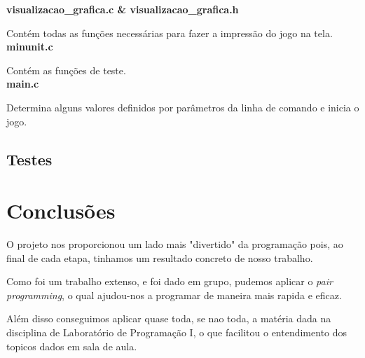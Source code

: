 \documentclass[12pt,a4paper]{article}
\begin{document}
\textbf{visualizacao\_grafica.c \& visualizacao\_grafica.h}

Contém todas as funções necessárias para fazer a impressão do jogo na tela.\\

\textbf{minunit.c}

Contém as funções de teste.\\

\textbf{main.c}

Determina alguns valores definidos por parâmetros da linha de comando e inicia o jogo.\\


\subsection{Testes}

\section{Conclusões}

O projeto nos proporcionou um lado mais "divertido"  da programação pois, ao final de cada etapa, tinhamos um resultado
concreto de nosso trabalho.

Como foi um trabalho extenso, e foi dado em grupo, pudemos aplicar o \emph{pair programming}, o qual ajudou-nos a programar
de maneira mais rapida e eficaz.

Além disso conseguimos aplicar quase toda, se nao toda, a matéria dada na disciplina de Laboratório de Programação I,
o que facilitou o entendimento dos topicos dados em sala de aula.
\end{document}
